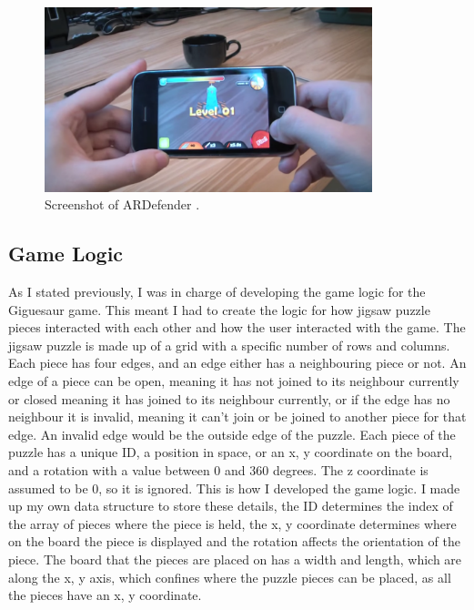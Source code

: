 \documentclass{article}
\begin{document}
\begin{figure}[ht]
\begin{center}
\includegraphics[width=0.85\textwidth]{images/ARDefenderImage}
\caption{Screenshot of ARDefender \cite{img:ARDefender}.}
\label{fig:ARDefender}
\end{center}
\end{figure}

\subsection{Game Logic}
As I stated previously, I was in charge of developing the game logic for the
Giguesaur game. This meant I had to create the logic for how jigsaw puzzle
pieces interacted with each other and how the user interacted with the game. The
jigsaw puzzle is made up of a grid with a specific number of rows and
columns. Each piece has four edges, and an edge either has a neighbouring piece
or not. An edge of a piece can be open, meaning it has not joined to its
neighbour currently or closed meaning it has joined to its neighbour currently,
or if the edge has no neighbour it is invalid, meaning it can't join or be
joined to another piece for that edge. An invalid edge would be the outside edge
of the puzzle. Each piece of the puzzle has a unique ID, a position in space, or
an x, y coordinate on the board, and a rotation with a value between 0 and 360
degrees. The z coordinate is assumed to be 0, so it is ignored. This is how I
developed the game logic. I made up my own data structure to store these
details, the ID determines the index of the array of pieces where the piece is
held, the x, y coordinate determines where on the board the piece is displayed
and the rotation affects the orientation of the piece. The board that the pieces
are placed on has a width and length, which are along the x, y axis, which
confines where the puzzle pieces can be placed, as all the pieces have an x, y
coordinate.
\end{document}
